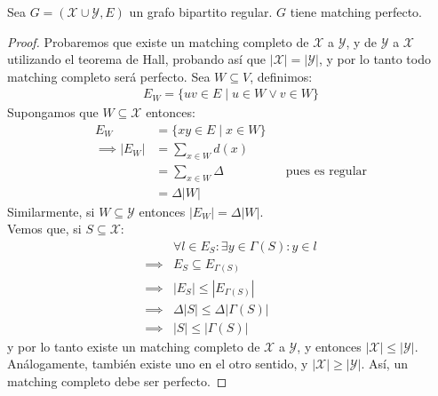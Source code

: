 \begin{theorem}
Sea $G = (\mathcal{X} \cup \mathcal{Y},E)$ un grafo bipartito regular. $G$ tiene matching perfecto.
\end{theorem}
\begin{proof}
Probaremos que existe un matching completo de $\mathcal{X}$ a $\mathcal{Y}$, y de $\mathcal{Y}$ a $\mathcal{X}$ utilizando el teorema de Hall, probando así que $\left| \mathcal{X} \right| = \left| \mathcal{Y} \right|$, y por lo tanto todo matching completo será perfecto. Sea $W \subseteq V$, definimos:
\begin{align}
    E_W = \{uv\in E\mid u \in W \vee v\in W\}
\end{align}
Supongamos que $W \subseteq \mathcal{X}$ entonces:
\begin{align}
    E_W &= \{xy\in E\mid x\in W\}\\
    \implies \left| E_W \right| &= \sum_{x \in W} d(x)\\
    &= \sum_{x \in W} \Delta && \text{pues es regular}\\
    &= \Delta \left| W \right|
\end{align}
Similarmente, si $W \subseteq \mathcal{Y}$ entonces $\left|E_W\right| = \Delta \left| W\right|$.\\
Vemos que, si $S \subseteq \mathcal{X}$:
\begin{align}
    & \forall l \in E_S : \exists y \in \Gamma(S) : y \in l\\
    \implies & E_S \subseteq E_{\Gamma(S)}\\
    \implies & \left| E_S \right| \le \left| E_{\Gamma(S)} \right|\\
    \implies & \Delta \left| S \right| \le \Delta \left| \Gamma(S) \right|\\
    \implies & \left| S \right| \le \left| \Gamma(S) \right|
\end{align}
y por lo tanto existe un matching completo de $\mathcal{X}$ a $\mathcal{Y}$, y entonces $\left| \mathcal{X} \right| \le \left| \mathcal{Y} \right|$. Análogamente, también existe uno en el otro sentido, y $\left| \mathcal{X} \right| \ge \left| \mathcal{Y} \right|$. Así, un matching completo debe ser perfecto.
\end{proof}

